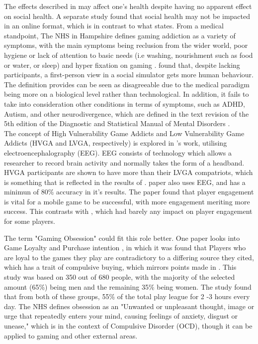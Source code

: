 \documentclass[conference]{IEEEtran}
\begin{document}
The effects described in \cite{Rahman2021} may affect one's health despite having no apparent effect on social health. A separate study \cite{Schlagowski2024} found that social health may not be impacted in an online format, which is in contrast to what \cite{NHSHamp24} states. From a medical standpoint, The NHS in Hampshire defines gaming addiction as a variety of symptoms, with the main symptoms being reclusion from the wider world, poor hygiene or lack of attention to basic needs (i.e washing, nourishment such as food or water, or sleep) and hyper fixation on gaming \cite{NHSHamp24}. \cite{Schlagowski2024} found that, despite lacking participants, a first-person view in a social simulator gets more human behaviour. The definition \cite{NHSHamp24} provides can be seen as disagreeable due to the medical paradigm being more on a biological level rather than technological. In addition, it fails to take into consideration other conditions in terms of symptoms, such as ADHD, Autism, and other neurodivergence, which are defined in the text revision of the 5th edition of the Diagnostic and Statistical Manual of Mental Disorders \cite{Association2022}.\\

The concept of High Vulnerability Game Addicts and Low Vulnerability Game Addicts (HVGA and LVGA, respectively) is explored in \cite{Jing2024}'s work, utilising electroencephalography (EEG). EEG consists of technology which allows a researcher to record brain activity and normally takes the form of a headband. HVGA participants are shown to have more than their LVGA compatriots, which is something that is reflected in the results of \cite{Naaj2021}. \cite{Ruqeyya2022} paper also uses EEG, and has a minimun of 80\%  accuracy in it's results. The paper found that player engagement is vital for a mobile game to be successful, with more engagement meriting more success. This contrasts with \cite{Schlagowski2024}, which had barely any impact on player engagement for some players.

The term "Gaming Obsession" could fit this role better. One paper looks into Game Loyalty and Purchase intention \cite{Ramli2022}, in which it was found that Players who are loyal to the games they play are contradictory to a differing source they cited\cite{Widodo2020}, which has a trait of compulsive buying, which mirrors points made in \cite{yasir2021}.  This study was based on 350 out of 680 people, with the majority of the selected amount (65\%) being men and the remaining 35\% being women. The study found that from both of these groups, 55\% of the total play league for 2 -3 hours every day. The NHS  \cite{NHS2021} defines obsession as an "Unwanted or unpleasant thought, image or urge that repeatedly enters your mind, causing feelings of anxiety, disgust or unease," which is in the context of Compulsive Disorder (OCD), though it can be applied to gaming and other external areas.\\
\end{document}
